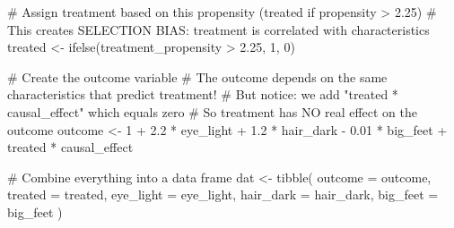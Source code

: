 \documentclass[
  letterpaper,
  DIV=11,
  numbers=noendperiod]{scrreprt}
\newenvironment{Shaded}{\begin{snugshade}}{\end{snugshade}}
\newcommand{\AttributeTok}[1]{\textcolor[rgb]{0.40,0.45,0.13}{#1}}
\newcommand{\CommentTok}[1]{\textcolor[rgb]{0.37,0.37,0.37}{#1}}
\newcommand{\DecValTok}[1]{\textcolor[rgb]{0.68,0.00,0.00}{#1}}
\newcommand{\FloatTok}[1]{\textcolor[rgb]{0.68,0.00,0.00}{#1}}
\newcommand{\FunctionTok}[1]{\textcolor[rgb]{0.28,0.35,0.67}{#1}}
\newcommand{\NormalTok}[1]{\textcolor[rgb]{0.00,0.23,0.31}{#1}}
\newcommand{\OtherTok}[1]{\textcolor[rgb]{0.00,0.23,0.31}{#1}}
\newcommand{\SpecialCharTok}[1]{\textcolor[rgb]{0.37,0.37,0.37}{#1}}
\begin{document}
\begin{Shaded}
\begin{Highlighting}[]
\CommentTok{\# Assign treatment based on this propensity (treated if propensity \textgreater{} 2.25)}
\CommentTok{\# This creates SELECTION BIAS: treatment is correlated with characteristics}
\NormalTok{treated }\OtherTok{\textless{}{-}} \FunctionTok{ifelse}\NormalTok{(treatment\_propensity }\SpecialCharTok{\textgreater{}} \FloatTok{2.25}\NormalTok{, }\DecValTok{1}\NormalTok{, }\DecValTok{0}\NormalTok{)}

\CommentTok{\# Create the outcome variable}
\CommentTok{\# The outcome depends on the same characteristics that predict treatment!}
\CommentTok{\# But notice: we add "treated * causal\_effect" which equals zero}
\CommentTok{\# So treatment has NO real effect on the outcome}
\NormalTok{outcome }\OtherTok{\textless{}{-}} \DecValTok{1} \SpecialCharTok{+} \FloatTok{2.2} \SpecialCharTok{*}\NormalTok{ eye\_light }\SpecialCharTok{+} \FloatTok{1.2} \SpecialCharTok{*}\NormalTok{ hair\_dark }\SpecialCharTok{{-}} \FloatTok{0.01} \SpecialCharTok{*}\NormalTok{ big\_feet }\SpecialCharTok{+}\NormalTok{ treated }\SpecialCharTok{*}\NormalTok{ causal\_effect}

\CommentTok{\# Combine everything into a data frame}
\NormalTok{dat }\OtherTok{\textless{}{-}} \FunctionTok{tibble}\NormalTok{(}
  \AttributeTok{outcome =}\NormalTok{ outcome,}
  \AttributeTok{treated =}\NormalTok{ treated,}
  \AttributeTok{eye\_light =}\NormalTok{ eye\_light,}
  \AttributeTok{hair\_dark =}\NormalTok{ hair\_dark,}
  \AttributeTok{big\_feet =}\NormalTok{ big\_feet}
\NormalTok{)}
\end{Highlighting}
\end{Shaded}
\end{document}
